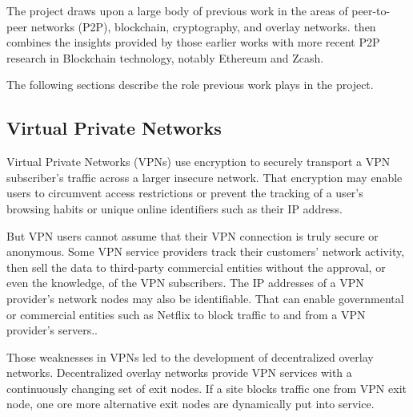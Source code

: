 The \orchid{} project draws upon a large body of previous work in the areas of peer-to-peer networks (P2P), blockchain, cryptography, and overlay networks. \orchid{} then combines the insights provided by those earlier works with more recent P2P research in Blockchain technology, notably Ethereum\cite{11} and Zcash\cite{12}.

The following sections describe the role previous work plays in the \orchid{} project.


\subsection{Virtual Private Networks}
Virtual Private Networks (VPNs) use encryption to securely transport a VPN subscriber's traffic across a larger insecure network. That encryption may enable users to circumvent access restrictions or prevent the tracking of a user's browsing habits or unique online identifiers such as their IP address.

But VPN users cannot assume that their VPN connection is truly secure or anonymous. Some VPN service providers track their customers' network activity, then sell the data to third-party commercial entities without the approval, or even the knowledge, of the VPN subscribers. The IP addresses of a VPN provider's network nodes may also be identifiable. That can enable governmental or commercial entities such as Netflix to block traffic to and from a VPN provider’s servers.\cite{13}.

Those weaknesses in VPNs led to the development of decentralized overlay networks. Decentralized overlay networks provide VPN services with a continuously changing set of exit nodes. If a site blocks traffic one from VPN exit node, one ore more alternative exit nodes are dynamically put into service.

